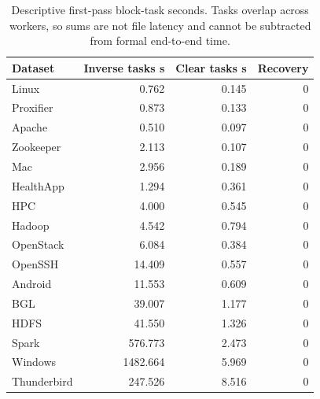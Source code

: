 \begin{longtable}{lrrr}
\caption{Descriptive first-pass block-task seconds. Tasks overlap across workers, so sums are not file latency and cannot be subtracted from formal end-to-end time.}\\
\toprule
Dataset & Inverse tasks s & Clear tasks s & Recovery \\ \midrule\endhead
Linux & 0.762 & 0.145 & 0 \\
Proxifier & 0.873 & 0.133 & 0 \\
Apache & 0.510 & 0.097 & 0 \\
Zookeeper & 2.113 & 0.107 & 0 \\
Mac & 2.956 & 0.189 & 0 \\
HealthApp & 1.294 & 0.361 & 0 \\
HPC & 4.000 & 0.545 & 0 \\
Hadoop & 4.542 & 0.794 & 0 \\
OpenStack & 6.084 & 0.384 & 0 \\
OpenSSH & 14.409 & 0.557 & 0 \\
Android & 11.553 & 0.609 & 0 \\
BGL & 39.007 & 1.177 & 0 \\
HDFS & 41.550 & 1.326 & 0 \\
Spark & 576.773 & 2.473 & 0 \\
Windows & 1482.664 & 5.969 & 0 \\
Thunderbird & 247.526 & 8.516 & 0 \\
\bottomrule\end{longtable}
